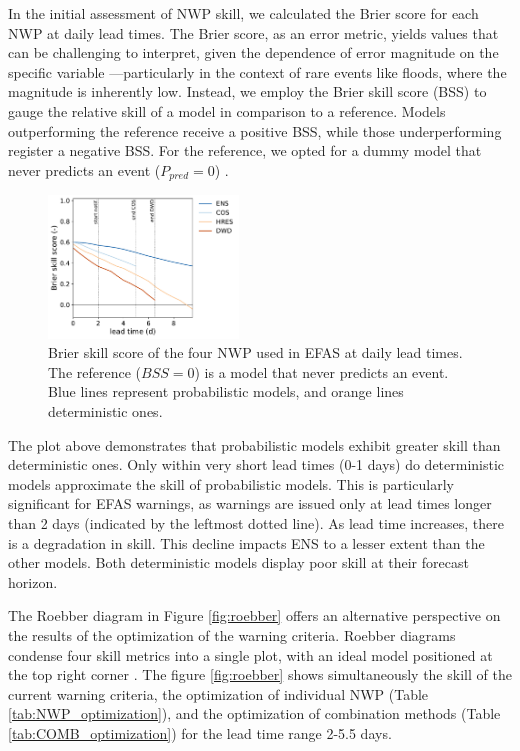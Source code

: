 \documentclass{ametsocV6.1}
\begin{document}
\appendix[B]
\label{appendix:NWP_prob_skill}

In the initial assessment of NWP skill, we calculated the Brier score for each NWP at daily lead times. The Brier score, as an error metric, yields values that can be challenging to interpret, given the dependence of error magnitude on the specific variable —particularly in the context of rare events like floods, where the magnitude is inherently low. Instead, we employ the Brier skill score (BSS) to gauge the relative skill of a model in comparison to a reference. Models outperforming the reference receive a positive BSS, while those underperforming register a negative BSS. For the reference, we opted for a dummy model that never predicts an event ($P_{pred}=0$) \citep{Legg2004}.

\begin{figure}[ht]
    \centering
    \includegraphics[width=0.45\textwidth]{figureB1.pdf}
    \caption{Brier skill score of the four NWP used in EFAS at daily lead times. The reference ($BSS=0$) is a model that never predicts an event. Blue lines represent probabilistic models, and orange lines deterministic ones.}
    \label{fig:BSS}
\end{figure}

The plot above demonstrates that probabilistic models exhibit greater skill than deterministic ones. Only within very short lead times (0-1 days) do deterministic models approximate the skill of probabilistic models. This is particularly significant for EFAS warnings, as warnings are issued only at lead times longer than 2 days (indicated by  the leftmost dotted line). As lead time increases, there is a degradation in skill. This decline impacts ENS to a lesser extent than the other models. Both deterministic models display poor skill at their forecast horizon.

\appendix[C]
\label{appendix:roebber}

The Roebber diagram in Figure \ref{fig:roebber} offers an alternative perspective on the results of the optimization of the warning criteria. Roebber diagrams condense four skill metrics into a single plot, with an ideal model positioned at the top right corner \citep{Roebber2009}. The figure \ref{fig:roebber} shows simultaneously the skill of the current warning criteria, the optimization of individual NWP (Table \ref{tab:NWP_optimization}), and the optimization of combination methods (Table \ref{tab:COMB_optimization}) for the lead time range 2-5.5 days.
\end{document}
